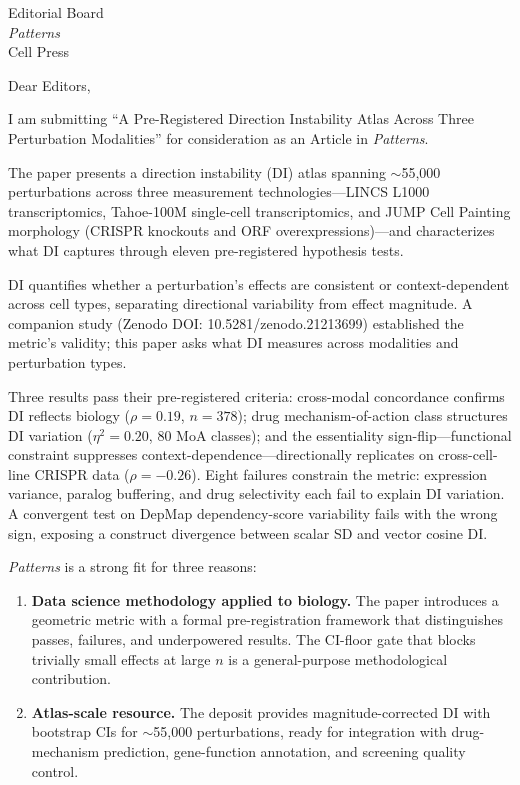 \documentclass[11pt]{letter}
\begin{document}
\begin{letter}{Editorial Board \\ \emph{Patterns} \\ Cell Press}

\opening{Dear Editors,}

I am submitting ``A Pre-Registered Direction Instability Atlas Across Three Perturbation Modalities'' for consideration as an Article in \emph{Patterns}.

The paper presents a direction instability (DI) atlas spanning ${\sim}$55,000 perturbations across three measurement technologies---LINCS L1000 transcriptomics, Tahoe-100M single-cell transcriptomics, and JUMP Cell Painting morphology (CRISPR knockouts and ORF overexpressions)---and characterizes what DI captures through eleven pre-registered hypothesis tests.

DI quantifies whether a perturbation's effects are consistent or context-dependent across cell types, separating directional variability from effect magnitude. A companion study (Zenodo DOI: 10.5281/zenodo.21213699) established the metric's validity; this paper asks what DI measures across modalities and perturbation types.

Three results pass their pre-registered criteria: cross-modal concordance confirms DI reflects biology ($\rho = 0.19$, $n = 378$); drug mechanism-of-action class structures DI variation ($\eta^2 = 0.20$, 80 MoA classes); and the essentiality sign-flip---functional constraint suppresses context-dependence---directionally replicates on cross-cell-line CRISPR data ($\rho = -0.26$). Eight failures constrain the metric: expression variance, paralog buffering, and drug selectivity each fail to explain DI variation. A convergent test on DepMap dependency-score variability fails with the wrong sign, exposing a construct divergence between scalar SD and vector cosine DI.

\emph{Patterns} is a strong fit for three reasons:

\begin{enumerate}
\item \textbf{Data science methodology applied to biology.} The paper introduces a geometric metric with a formal pre-registration framework that distinguishes passes, failures, and underpowered results. The CI-floor gate that blocks trivially small effects at large $n$ is a general-purpose methodological contribution.

\item \textbf{Atlas-scale resource.} The deposit provides magnitude-corrected DI with bootstrap CIs for ${\sim}$55,000 perturbations, ready for integration with drug-mechanism prediction, gene-function annotation, and screening quality control.


\end{enumerate}
\end{letter}
\end{document}
